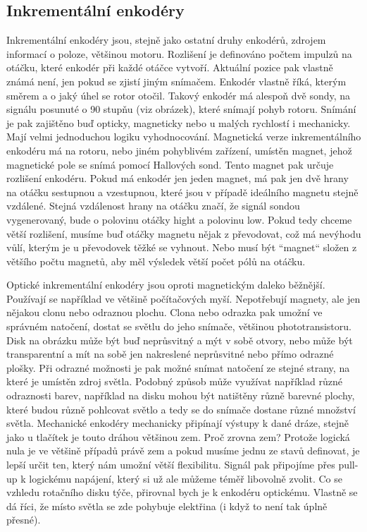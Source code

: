 \documentclass{template/socthesis}
\begin{document}
	\subsection*{Inkrementální enkodéry}
	Inkrementální enkodéry jsou, stejně jako ostatní druhy enkodérů, zdrojem informací o poloze, většinou motoru. Rozlišení je definováno počtem impulzů na otáčku, které enkodér při každé otáčce vytvoří. Aktuální pozice pak vlastně známá není, jen pokud se zjistí jiným snímačem. Enkodér vlastně říká, kterým směrem a o jaký úhel se rotor otočil. Takový enkodér má alespoň dvě sondy, na signálu posunuté o 90 stupňu (viz obrázek), které snímají pohyb rotoru. Snímání je pak zajištěno buď opticky, magneticky nebo u malých rychlostí i mechanicky. Mají velmi jednoduchou logiku vyhodnocování. Magnetická verze inkrementálního enkodéru má na rotoru, nebo jiném pohyblivém zařízení, umístěn magnet, jehož magnetické pole se snímá pomocí Hallových sond. Tento magnet pak určuje rozlišení enkodéru. Pokud má enkodér jen jeden magnet, má pak jen dvě hrany na otáčku sestupnou a vzestupnou, které jsou v případě ideálního magnetu stejně vzdálené. Stejná vzdálenost hrany na otáčku značí, že signál sondou vygenerovaný, bude o polovinu otáčky hight a polovinu low. Pokud tedy chceme větší rozlišení, musíme buď otáčky magnetu nějak z převodovat, což má nevýhodu vůlí, kterým je u převodovek těžké se vyhnout. Nebo musí být “magnet“ složen z většího počtu magnetů, aby měl výsledek větší počet pólů na otáčku.
	
	Optické inkrementální enkodéry jsou oproti magnetickým daleko běžnější. Používají se například ve většině počítačových myší. Nepotřebují magnety, ale jen nějakou clonu nebo odraznou plochu. Clona nebo odrazka pak umožní ve správném natočení, dostat se světlu do jeho snímače, většinou phototransistoru.
	Disk na obrázku může být buď neprůsvitný a mýt v sobě otvory, nebo může být transparentní a mít na sobě jen nakreslené neprůsvitné nebo přímo odrazné plošky. Při odrazné možnosti je pak možné snímat natočení ze stejné strany, na které je umístěn zdroj světla. Podobný způsob může využívat například různé odraznosti barev, například na disku mohou být natištěny různě barevné plochy, které budou různě pohlcovat světlo a tedy se do snímače dostane různé množství světla. 
	Mechanické enkodéry mechanicky připínají výstupy k dané dráze, stejně jako u tlačítek je touto dráhou většinou zem. Proč zrovna zem? Protože logická nula je ve většině případů právě zem a pokud musíme jednu ze stavů definovat, je lepší určit ten, který nám umožní větší flexibilitu. Signál pak připojíme přes pull-up k logickému napájení, který si už ale můžeme téměř libovolně zvolit. 
	Co se vzhledu rotačního disku týče, přirovnal bych je k enkodéru optickému. Vlastně se dá říci, že místo světla se zde pohybuje elektřina (i když to není tak úplně přesné).
	
\end{document}
